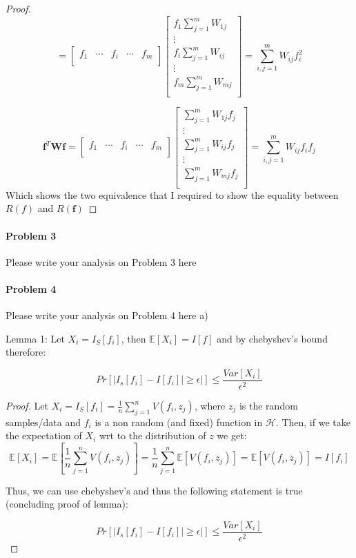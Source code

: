 \documentclass[12pt]{report}
\begin{document}
\begin{proof}
$$
=
\begin{bmatrix}
f_1& \cdots & f_i & \cdots & f_m\\
\end{bmatrix} 
%
\begin{bmatrix}
f_1 \sum_{j=1}^{m}W_{1j} \\ 
\vdots \\
f_i \sum_{j=1}^{m}W_{ij}\\
\vdots \\
f_m \sum_{j=1}^{m}W_{mj}\\
\end{bmatrix}
=
\sum^m_{i,j=1} W_{ij}f_i^2
$$


$$
\mathbf{f}^T\mathbf{W}\mathbf{f} = 
\begin{bmatrix}
f_1& \cdots & f_i & \cdots & f_m\\
\end{bmatrix} 
%
\begin{bmatrix}
\sum_{j=1}^{m}W_{1j}f_j \\ 
\vdots \\
\sum_{j=1}^{m}W_{ij}f_j\\
\vdots \\
\sum_{j=1}^{m}W_{mj}f_j\\
\end{bmatrix}
=
\sum^m_{i,j=1}W_{ij}f_if_j
$$
Which shows the two equivalence that I required to show the equality between $R(f)$ and $R(\mathbf{f})$
\end{proof}




\paragraph{Problem 3}
Please write your analysis on Problem 3 here


\paragraph{Problem 4}
Please write your analysis on Problem 4 here
a)


Lemma 1: Let $X_i = I_S[f_i]$, then $\mathbb{E}[X_i] = I[f]$ and by chebyshev's bound therefore:

$$ Pr[ | I_s[f_i] - I[f_i] | \geq \epsilon|] \leq \frac{ Var[X_i] }{ \epsilon^2 } $$

\begin{proof}
Let $X_i = I_S[f_i] = \frac{1}{n} \sum^{n}_{j=1} V(f_i, z_j)$, where $z_j$ is the random samples/data and $f_i$ is a non random (and fixed) function in $\mathcal{H}$. Then, if we take the expectation of $X_i$ wrt to the distribution of $z$ we get:
$$\mathbb{E}[X_i]  = \mathbb{E}[\frac{1}{n} \sum^{n}_{j=1} V(f_i, z_j)] = \frac{1}{n} \sum^{n}_{j=1} \mathbb{E}[V(f_i, z_j)] =  \mathbb{E}[V(f_i, z_j)] = I[f_i]$$

Thus, we can use chebyshev's and thus the following statement is true (concluding proof of lemma):

$$ Pr[ | I_s[f_i] - I[f_i] | \geq \epsilon|] \leq \frac{ Var[X_i] }{ \epsilon^2 } $$

\end{proof}
\end{document}
